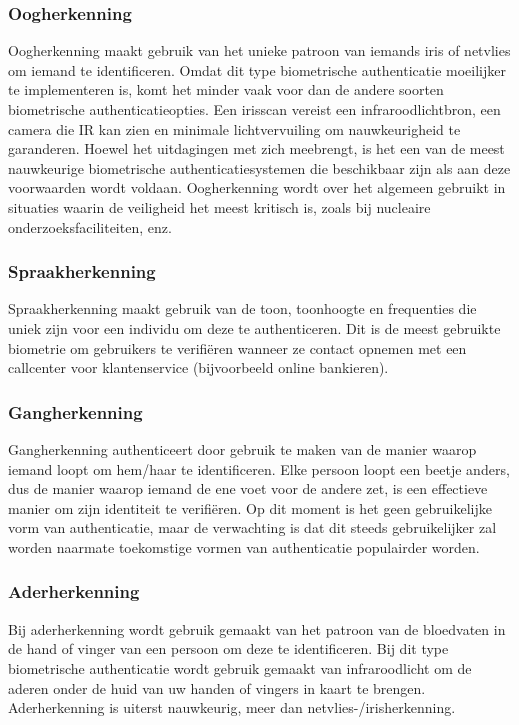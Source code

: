 \subsubsection{Oogherkenning}%
\label{subsubsec:oogherkenning}
Oogherkenning maakt gebruik van het unieke patroon van iemands iris of netvlies om iemand te identificeren. Omdat dit type biometrische authenticatie moeilijker te implementeren is, komt het minder vaak voor dan de andere soorten biometrische authenticatieopties. Een irisscan vereist een infraroodlichtbron, een camera die IR kan zien en minimale lichtvervuiling om nauwkeurigheid te garanderen. Hoewel het uitdagingen met zich meebrengt, is het een van de meest nauwkeurige biometrische authenticatiesystemen die beschikbaar zijn als aan deze voorwaarden wordt voldaan. Oogherkenning wordt over het algemeen gebruikt in situaties waarin de veiligheid het meest kritisch is, zoals bij nucleaire onderzoeksfaciliteiten, enz.

\subsubsection{Spraakherkenning}%
\label{subsubsec:spraakherkenning}
Spraakherkenning maakt gebruik van de toon, toonhoogte en frequenties die uniek zijn voor een individu om deze te authenticeren. Dit is de meest gebruikte biometrie om gebruikers te verifiëren wanneer ze contact opnemen met een callcenter voor klantenservice (bijvoorbeeld online bankieren).

\subsubsection{Gangherkenning}%
\label{subsubsec:gangherkenning}
Gangherkenning authenticeert door gebruik te maken van de manier waarop iemand loopt om hem/haar te identificeren. Elke persoon loopt een beetje anders, dus de manier waarop iemand de ene voet voor de andere zet, is een effectieve manier om zijn identiteit te verifiëren. Op dit moment is het geen gebruikelijke vorm van authenticatie, maar de verwachting is dat dit steeds gebruikelijker zal worden naarmate toekomstige vormen van authenticatie populairder worden.

\subsubsection{Aderherkenning}%
\label{subsubsec:aderherkenning}
Bij aderherkenning wordt gebruik gemaakt van het patroon van de bloedvaten in de hand of vinger van een persoon om deze te identificeren. Bij dit type biometrische authenticatie wordt gebruik gemaakt van infraroodlicht om de aderen onder de huid van uw handen of vingers in kaart te brengen. Aderherkenning is uiterst nauwkeurig, meer dan netvlies-/irisherkenning.

